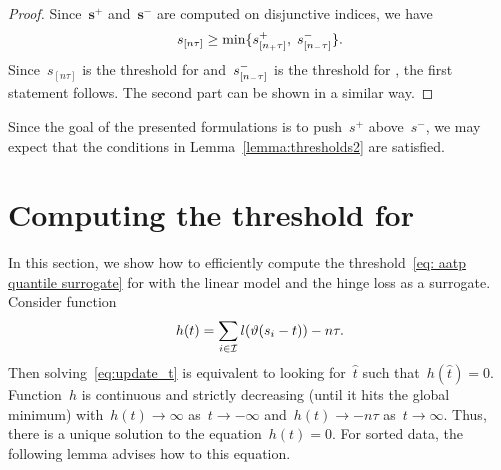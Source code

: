\begin{proof}
  Since~$\bm{s}^+$ and~$\bm{s}^-$ are computed on disjunctive indices, we have
  \begin{equation*}
    s_{[n\tau]} \geq \min\{s_{[n_{+}\tau]}^+, \; s_{[n_{-}\tau]}^-\}.
  \end{equation*}
  Since~$s_{[n\tau]}$ is the threshold for \Grill and~$s_{[n_{-}\tau]}^-$ is the threshold for \GrillNP, the first statement follows. The second part can be shown in a similar way.
\end{proof}

Since the goal of the presented formulations is to push~$s^+$ above~$s^-$, we may expect that the conditions in Lemma~\ref{lemma:thresholds2} are satisfied. 

\section{Computing the threshold for \PatMat}\label{app:threshold}

In this section, we show how to efficiently compute the threshold~\eqref{eq: aatp quantile surrogate} for \PatMat with the linear model and the hinge loss as a surrogate. Consider function
\begin{equation}\label{eq:defin_h}
  h(t) = \sum_{i \in \I} l\Brac{\vartheta(s_i - t)} - n\tau.
\end{equation}
Then solving~\eqref{eq:update_t} is equivalent to looking for~$\hat{t}$ such that~$h(\hat{t}) = 0$. Function~$h$ is continuous and strictly decreasing (until it hits the global minimum) with~$h(t) \to \infty$ as~$t \to -\infty$ and~$h(t) \to -n\tau$ as~$t \to \infty$. Thus, there is a unique solution to the equation~$h(t) = 0$. For sorted data, the following lemma advises how to this equation.

